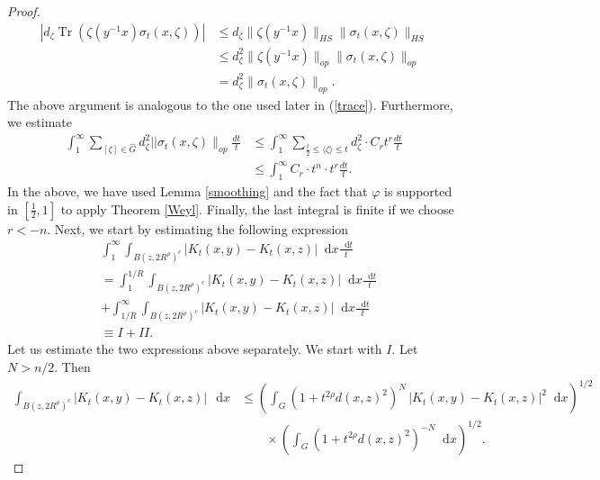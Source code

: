 \documentclass[12pt, reqno]{amsart}
\theoremstyle{definition}
\theoremstyle{remark}
\numberwithin{equation}{section}
\newcommand*\diff{\mathop{}\!\mathrm{d}}
\begin{document}
\begin{proof}
\begin{equation*}
\begin{aligned}
    |d_\zeta\operatorname{Tr}(\zeta(y^{-1}x)\sigma_t(x,\zeta))|&\leq d_\zeta\|\zeta(y^{-1}x)\|_{HS}\|\sigma_t(x,\zeta)\|_{HS}\\
    &\leq d_\zeta^2\|\zeta(y^{-1}x)\|_{op}\|\sigma_t(x,\zeta)\|_{op}\\
    &= d_\zeta^2\|\sigma_t(x,\zeta)\|_{op}.
\end{aligned}
\end{equation*}
The above argument is analogous to the one used later in (\ref{trace}). Furthermore, we estimate 
\begin{equation*}
\begin{aligned}
    \int_{1}^{\infty}\sum_{[\zeta]\in\widehat{G}}d_\zeta^2||\sigma_t(x,\zeta)\|_{op}\frac{dt}{t}&\leq\int_{1}^{\infty}\sum_{\frac{t}{2}\leq\langle\zeta\rangle\leq t}d_\zeta^2\cdot C_r t^r\frac{dt}{t}\\
    &\leq\int_{1}^{\infty}C_r\cdot t^n\cdot t^r\frac{dt}{t}.
\end{aligned}
\end{equation*}
In the above, we have used Lemma \ref{smoothing} and the fact that $\varphi$ is supported in $[\frac{1}{2},1]$ to apply Theorem \ref{Weyl}. Finally, the last integral is finite if we choose $r<-n$. Next, we start by estimating the following expression 
   \begin{equation*}
\begin{aligned}
    &\int_{1}^{\infty}\int_{B(z, 2R^\rho)^c}|K_t(x,y)-K_t(x,z)|\diff{x}\frac{\diff{t}}{t}\\
       &=\int_{1}^{1/R}\int_{B(z,2R^\rho)^c}|K_t(x,y)-K_t(x,z)|\diff{x}\frac{\diff{ t}}{t}\\
       &+\int_{1/R}^{\infty}\int_{B(z, 2R^\rho)^c}|K_t(x,y)-K_t(x,z)|\diff{x}\frac{\diff{t}}{t}\\
       &\equiv I+II.
\end{aligned}
\end{equation*}
Let us estimate the two expressions above separately. We start with $I$. Let $N>n/2$. Then
\begin{equation*}
\begin{aligned}
\int_{B(z,2R^{\rho})^c} |K_t(x,y)-K_t(x,z)|\,\diff{x}
&\le
\left(
\int_{G} (1+t^{2\rho}d(x,z)^2)^N
\,|K_t(x,y)-K_t(x,z)|^2 \diff{x}
\right)^{1/2} \\
&\qquad\times
\left(
\int_{G}
(1+t^{2\rho}d(x,z)^2)^{-N} \diff{x}
\right)^{1/2}.
\end{aligned}

\end{equation*}
\end{proof}
\end{document}
